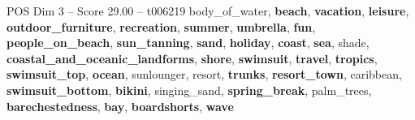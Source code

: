 \begin{textsample}{POS Dim 3 – Score 29.00 – t006219}  \label{ex:f3_pos_007}
body\_of\_water, \textbf{beach}, \textbf{vacation}, \textbf{leisure}, \textbf{outdoor\_furniture}, \textbf{recreation}, \textbf{summer}, \textbf{umbrella}, \textbf{fun}, \textbf{people\_on\_beach}, \textbf{sun\_tanning}, \textbf{sand}, \textbf{holiday}, \textbf{coast}, \textbf{sea}, shade, \textbf{coastal\_and\_oceanic\_landforms}, \textbf{shore}, \textbf{swimsuit}, \textbf{travel}, \textbf{tropics}, \textbf{swimsuit\_top}, \textbf{ocean}, sunlounger, resort, \textbf{trunks}, \textbf{resort\_town}, caribbean, \textbf{swimsuit\_bottom}, \textbf{bikini}, singing\_sand, \textbf{spring\_break}, palm\_trees, \textbf{barechestedness}, \textbf{bay}, \textbf{boardshorts}, \textbf{wave}

\end{textsample}
